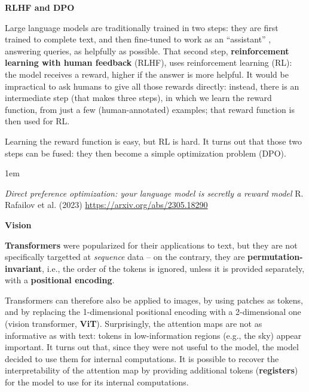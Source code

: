 \documentclass[a5paper]{article}
\let\d\textbf
\newenvironment{reference}{%
  \medskip\goodbreak
  \parskip 0pt
  \raggedright
  \leftskip 1em
  \obeylines
}{\par\medskip\goodbreak}
\def\subsection#1{{\par\bigskip\goodbreak\large\bfseries #1\par}}
\begin{document}
\subsection{RLHF and DPO}

Large language models are traditionally trained in two steps:
they are first trained to complete text,
and then fine-tuned to work as an ``assistant'' , answering queries,
as helpfully as possible.
That second step, \d{reinforcement learning with human feedback} (RLHF),
uses reinforcement learning (RL):
the model receives a reward, higher if the answer is more helpful.
It would be impractical to ask humans to give all those rewards directly:
instead, there is an intermediate step (that makes three steps), in which we learn the reward
function, from just a few (human-annotated) examples;
that reward function is then used for RL.

Learning the reward function is easy, but RL is hard.
It turns out that those two steps can be fused:
they then become a simple optimization problem (DPO).

\begin{reference}
  \emph{Direct preference optimization: your language model is secretly a reward model}
  R. Rafailov et al. (2023)
  \url{https://arxiv.org/abs/2305.18290}
\end{reference}

\subsection{Vision}

\d{Transformers} were popularized for their applications to text,
but they are not specifically targetted at \emph{sequence} data -- on the contrary,
they are \d{permutation-invariant}, i.e., the order of the tokens is ignored,
unless it is provided separately, with a \d{positional encoding}.

Transformers can therefore also be applied to images,
by using patches as tokens, 
and by replacing the 1-dimensional positional encoding with a 2-dimensional one
(vision transformer, \d{ViT}).
Surprisingly, the attention maps are not as informative as with text:
tokens in low-information regions (e.g., the sky)
appear important.
It turns out that, since they were not useful to the model,
the model decided to use them for internal computations.
It is possible to recover the interpretability of the attention map
by providing additional tokens (\d{registers})
for the model to use for its internal computations.
\end{document}
